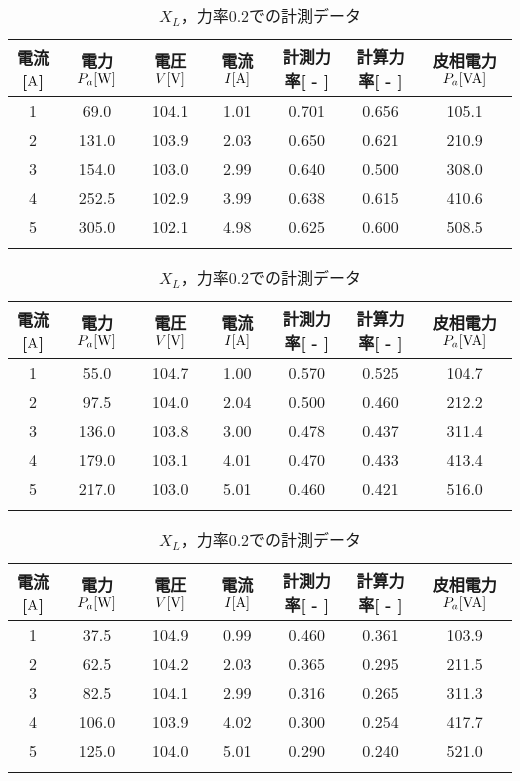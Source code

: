 \begin{itemize}
\begin{table}[h]
	\caption{$X_{L}$，力率$0.6$での計測データ}
	\label{tab:0.6data}
\begin{tabular}{ccccccc}
	\hline
	電流[$\rm{A}$] & 電力$P_a[\rm{W}]$ & 電圧$V[\rm{V}]$ & 電流$I[\rm{A}]$ & 計測力率[ - ] & 計算力率[ - ] & 皮相電力$P_a[\rm{VA}]$ \\ \hline
	1 & 69.0  & 104.1 & 1.01 & 0.701 & 0.656 & 105.1 \\
	2 & 131.0 & 103.9 & 2.03 & 0.650 & 0.621 & 210.9 \\
	3 & 154.0 & 103.0 & 2.99 & 0.640 & 0.500 & 308.0 \\
	4 & 252.5 & 102.9 & 3.99 & 0.638 & 0.615 & 410.6 \\
	5 & 305.0 & 102.1 & 4.98 & 0.625 & 0.600 & 508.5 \\ \hline\\
\end{tabular}
	\caption{$X_{L}$，力率$0.4$での計測データ}
	\label{tab:0.4data}
\begin{tabular}{ccccccc}
	\hline
	電流[$\rm{A}$] & 電力$P_a[\rm{W}]$ & 電圧$V[\rm{V}]$ & 電流$I[\rm{A}]$ & 計測力率[ - ] & 計算力率[ - ] & 皮相電力$P_a[\rm{VA}]$ \\ \hline
	1 & 55.0  & 104.7 & 1.00 & 0.570 & 0.525 & 104.7 \\
	2 & 97.5  & 104.0 & 2.04 & 0.500 & 0.460 & 212.2 \\
	3 & 136.0 & 103.8 & 3.00 & 0.478 & 0.437 & 311.4 \\
	4 & 179.0 & 103.1 & 4.01 & 0.470 & 0.433 & 413.4 \\
	5 & 217.0 & 103.0 & 5.01 & 0.460 & 0.421 & 516.0 \\ \hline\\
\end{tabular}
	\caption{$X_{L}$，力率$0.2$での計測データ}
	\label{tab:0.2data}
\begin{tabular}{ccccccc}
	\hline
	電流[$\rm{A}$] & 電力$P_a[\rm{W}]$ & 電圧$V[\rm{V}]$ & 電流$I[\rm{A}]$ & 計測力率[ - ] & 計算力率[ - ] & 皮相電力$P_a[\rm{VA}]$ \\ \hline
	1 & 37.5  & 104.9 & 0.99 & 0.460 & 0.361 & 103.9 \\
	2 & 62.5  & 104.2 & 2.03 & 0.365 & 0.295 & 211.5 \\
	3 & 82.5  & 104.1 & 2.99 & 0.316 & 0.265 & 311.3 \\
	4 & 106.0 & 103.9 & 4.02 & 0.300 & 0.254 & 417.7 \\
	5 & 125.0 & 104.0 & 5.01 & 0.290 & 0.240 & 521.0 \\ \hline\\

\end{tabular}
\end{table}
\end{itemize}
